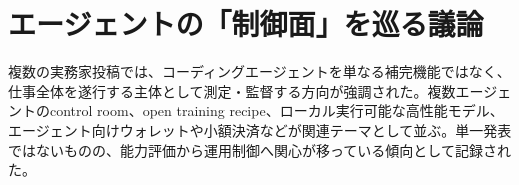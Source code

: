 \section{エージェントの「制御面」を巡る議論}
複数の実務家投稿では、コーディングエージェントを単なる補完機能ではなく、仕事全体を遂行する主体として測定・監督する方向が強調された。複数エージェントのcontrol room、open training recipe、ローカル実行可能な高性能モデル、エージェント向けウォレットや小額決済などが関連テーマとして並ぶ。単一発表ではないものの、能力評価から運用制御へ関心が移っている傾向として記録された。
